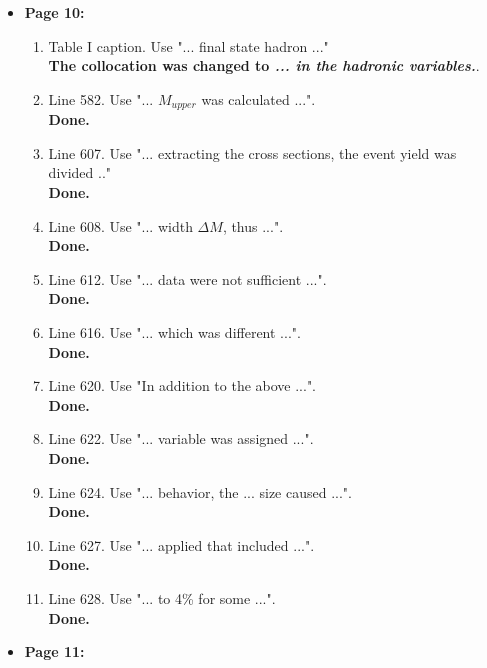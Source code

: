 \documentclass[,superscriptaddress,showpacs,amssymb,amsmath,amsfonts,linenumbers,article]{revtex4-1}
\begin{document}
\begin{itemize}
\begin{enumerate}
 \end{enumerate}
 

\item {\bf \large  Page 10:}
\begin{enumerate} 

\item Table I caption. Use "... final state hadron ..."\\
{\bf The collocation was changed to {\it ... in the hadronic variables.}}.
\item Line 582. Use "... $M_{upper}$ was calculated ...".\\
{\bf Done.}
\item Line 607. Use "... extracting the cross sections, the event yield was divided .."\\
{\bf Done.}
\item Line 608. Use "... width $\Delta M$, thus ...".\\
{\bf Done.}
\item Line 612. Use "... data were not sufficient ...".\\
{\bf Done.}
\item Line 616. Use "... which was different ...".\\
{\bf Done.}
\item Line 620. Use "In addition to the above ...".\\
{\bf Done.}
\item Line 622. Use "... variable was assigned ...".\\
{\bf Done.}
\item Line 624. Use "... behavior, the ... size caused ...".\\
{\bf Done.}
\item Line 627. Use "... applied that included ...".\\
{\bf Done.}
\item Line 628. Use "... to 4\% for some ...".\\
{\bf Done.}
 
\end{enumerate}


\item {\bf \large  Page 11:}
\begin{enumerate} 


\end{enumerate}
\end{itemize}
\end{document}
